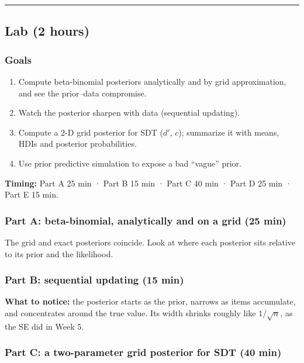 \begin{center}\rule{0.5\linewidth}{0.5pt}\end{center}


\subsection{Lab (2 hours)}

\subsubsection{Goals}

\begin{enumerate}
\def\labelenumi{\arabic{enumi}.}
\tightlist
\item
  Compute beta-binomial posteriors analytically and by grid
  approximation, and see the prior--data compromise.
\item
  Watch the posterior sharpen with data (sequential updating).
\item
  Compute a 2-D grid posterior for SDT (\(d'\), \(c\)); summarize it
  with means, HDIs and posterior probabilities.
\item
  Use prior predictive simulation to expose a bad ``vague'' prior.
\end{enumerate}

\textbf{Timing:} Part A 25 min · Part B 15 min · Part C 40 min · Part D
25 min · Part E 15 min.

\subsubsection{Part A: beta-binomial, analytically and on a grid (25
min)}

The grid and exact posteriors coincide. Look at where each posterior
sits relative to its prior and the likelihood.

\subsubsection{Part B: sequential updating (15 min)}

\textbf{What to notice:} the posterior starts as the prior, narrows as
items accumulate, and concentrates around the true value. Its width
shrinks roughly like \(1/\sqrt{n}\), as the SE did in Week 5.

\subsubsection{Part C: a two-parameter grid posterior for SDT (40 min)}

